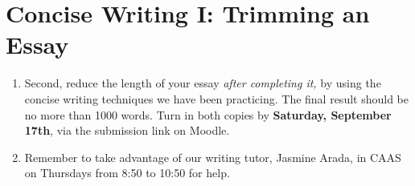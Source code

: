 \documentclass{article}
\begin{document}
\section{Concise Writing I: Trimming an Essay}

\begin{enumerate}
\item Second, reduce the length of your essay \textit{after completing it,} by using the concise writing techniques we have been practicing.  The final result should be no more than 1000 words.  Turn in both copies by \textbf{Saturday, September 17th}, via the submission link on Moodle.
\item Remember to take advantage of our writing tutor, Jasmine Arada, in CAAS on Thursdays from 8:50 to 10:50 for help.
\end{enumerate}
\end{document}

